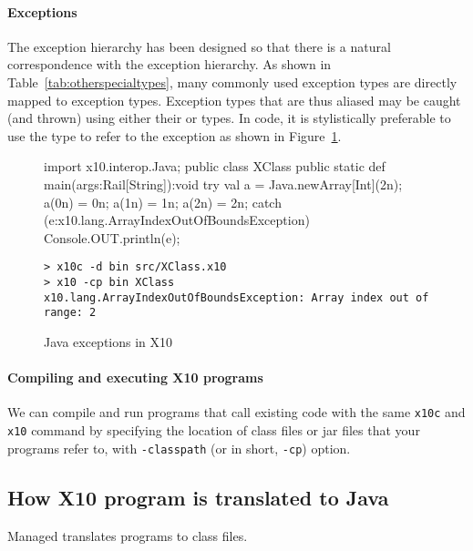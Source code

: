 \paragraph{Exceptions}

The \XtenCurrVer{} exception hierarchy has been designed so that there is a
natural correspondence with the \Java{} exception hierarchy. As shown in
Table~\ref{tab:otherspecialtypes}, many commonly used \Java{}
exception types are directly mapped to \Xten{} exception types. 
Exception types that are thus aliased may be caught (and thrown) using
either their \Java{} or \Xten types.  In \Xten code, it is stylistically
preferable to use the \Xten type to refer to the exception as shown in 
Figure~\ref{fig:javaexceptions}.

\begin{figure}
\begin{xten}
import x10.interop.Java;
public class XClass {   
  public static def main(args:Rail[String]):void {
    try {
      val a = Java.newArray[Int](2n);
      a(0n) = 0n;
      a(1n) = 1n;
      a(2n) = 2n;
    } catch (e:x10.lang.ArrayIndexOutOfBoundsException) {
      Console.OUT.println(e);
    }
  }
}
\end{xten}
\begin{verbatim}
> x10c -d bin src/XClass.x10
> x10 -cp bin XClass
x10.lang.ArrayIndexOutOfBoundsException: Array index out of range: 2
\end{verbatim}
\caption{Java exceptions in X10}
\label{fig:javaexceptions}
\end{figure}

\paragraph{Compiling and executing X10 programs}

We can compile and run \Xten{} programs that call existing \Java{} code with
the same \verb|x10c| and \verb|x10| command by specifying the location
of \Java{} class files or jar files that your \Xten{} programs refer to, with
\verb|-classpath| (or in short, \verb|-cp|) option.

\subsection{How X10 program is translated to Java}

Managed \Xten{} translates \Xten{} programs to \Java{} class files. 


